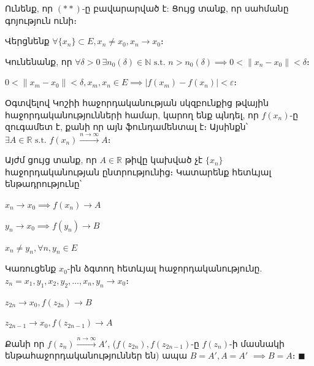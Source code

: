 \documentclass[12pt, a4paper]{article}
\begin{document}
Ունենք, որ $(**)$-ը բավարարված է: Ցույց տանք, որ սահմանը գոյություն ունի։

Վերցնենք $\forall \{x_n\} \subset E, x_n \neq x_0, x_n \to x_0$։

Կունենանք, որ $\forall \delta > 0 \ \exists n_0(\delta) \in \mathbb{N} \text{ s.t. } n > n_0(\delta) \implies 0 < \|x_n - x_0\| < \delta$։

$0 < \|x_m - x_0\| < \delta, x_m, x_n \in E \implies |f(x_m) - f(x_n)| < \varepsilon$։

Օգտվելով Կոշիի հաջորդականության սկզբունքից թվային հաջորդականությունների համար, կարող ենք պնդել, որ $f(x_n)$-ը զուգամետ է, քանի որ այն ֆունդամենտալ է։ Այսինքն՝ $\exists A \in \mathbb{R} \text{ s.t. } f(x_n) \overset{n \to \infty}{\longrightarrow} A$։

Այժմ ցույց տանք, որ $A \in \mathbb{R}$ թիվը կախված չէ $\{x_n\}$ հաջորդականության ընտրությունից։ Կատարենք հետևյալ ենթադրությունը՝

$x_n \to x_0 \implies f(x_n) \to A$

$y_n \to x_0 \implies f(y_n) \to B$

$x_n \neq y_n, \forall n, y_n \in E$

Կառուցենք $x_0$-ին ձգտող հետևյալ հաջորդականությունը. $z_n = x_1, y_1, x_2, y_2, \dots, x_n, y_n \to x_0$։

$z_{2n} \to x_0, f(z_{2n}) \to B$

$z_{2n-1} \to x_0, f(z_{2n-1}) \to A$

Քանի որ $f(z_n) \overset{n \to \infty}{\longrightarrow} A'$, ($f(z_{2n}), f(z_{2n-1})$-ը $f({z_n})$-ի մասնակի ենթահաջորդականություններ են) ապա $B=A', A = A'$ $\implies B = A$։ $\blacksquare$
\end{document}
